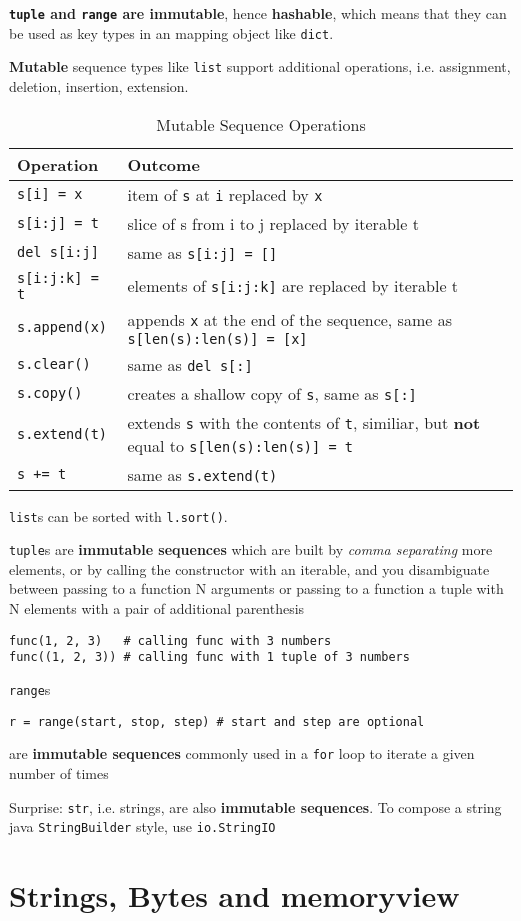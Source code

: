 \documentclass[10pt, openany]{article}
\begin{document}
  \textbf{\texttt{tuple} and \texttt{range} are immutable}, hence
  \textbf{hashable}, which means that they can be used as key types
  in an mapping object like \texttt{dict}.\par
  \textbf{Mutable} sequence types like \texttt{list} support 
  additional operations, i.e. assignment, deletion, insertion, 
  extension.\par
  \begin{table}[t]
    \centering
    \caption{Mutable Sequence Operations}
    \begin{tabular}{@{}ll@{}}
      \toprule
      \textbf{Operation} & \textbf{Outcome} \\
      \midrule
      \texttt{s[i] = x} & item of \texttt{s} at 
        \texttt{i} replaced by \texttt{x} \\
      \texttt{s[i:j] = t} & slice of s from i to j replaced by 
        iterable t \\
      \texttt{del s[i:j]} & same as \texttt{s[i:j] = []} \\
      \texttt{s[i:j:k] = t} & elements of \texttt{s[i:j:k]} are 
        replaced by iterable t \\
      \texttt{s.append(x)} & appends \texttt{x} at the end of the 
        sequence, same as \texttt{s[len(s):len(s)] = [x]} \\
      \texttt{s.clear()} & same as \texttt{del s[:]} \\
      \texttt{s.copy()} & creates a shallow copy of \texttt{s}, same
        as \texttt{s[:]} \\
      \texttt{s.extend(t)} & extends \texttt{s} with the contents of 
        \texttt{t}, similiar, but \textbf{not} equal 
        to \texttt{s[len(s):len(s)] = t} \\
      \texttt{s += t} & same as \texttt{s.extend(t)} \\
      \bottomrule
    \end{tabular}
  \end{table}
  \texttt{list}s can be sorted with \texttt{l.sort()}.\par
  \texttt{tuple}s are \textbf{immutable sequences} which are built by
  \textit{comma separating} more elements, or by calling the 
  constructor with an iterable, and you disambiguate between 
  passing to a function N arguments or passing to a function a tuple 
  with N elements with a pair of additional parenthesis
  \begin{lstlisting}
func(1, 2, 3)   # calling func with 3 numbers
func((1, 2, 3)) # calling func with 1 tuple of 3 numbers
  \end{lstlisting}
  \texttt{range}s
  \begin{lstlisting}
r = range(start, stop, step) # start and step are optional
  \end{lstlisting}
  are \textbf{immutable sequences} commonly used in a \texttt{for} 
  loop to iterate a given number of times\par
  Surprise: \texttt{str}, i.e. strings, are also 
  \textbf{immutable sequences}. To compose a string java 
  \texttt{StringBuilder} style, use \texttt{io.StringIO}\par
  \section{Strings, Bytes and memoryview} 
\end{document}

